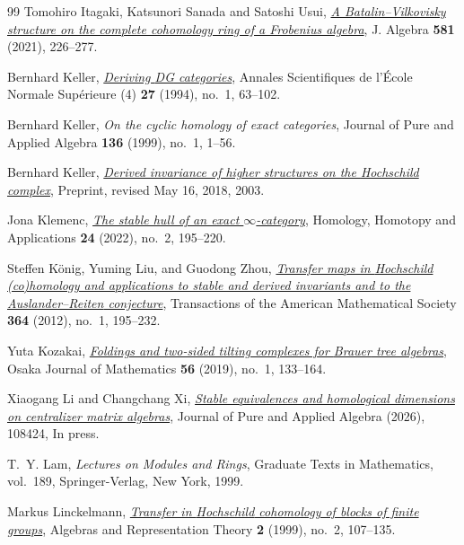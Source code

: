 \documentclass[12pt,a4paper,english,reqno]{amsart}
\numberwithin{equation}{section}
\theoremstyle{plain}
\theoremstyle{definition}
\begin{document}
\begin{thebibliography}{99}
Tomohiro Itagaki, Katsunori Sanada and Satoshi Usui,
\emph{\href{https://doi.org/10.1016/j.jalgebra.2021.04.016}{A Batalin--Vilkovisky structure on the complete cohomology ring of a Frobenius algebra}},
J. Algebra \textbf{581} (2021), 226--277.

Bernhard Keller, \emph{\href{https://doi.org/10.24033/asens.1689}
  {Deriving {DG} categories}},
  Annales Scientifiques de l'\'Ecole Normale Sup\'erieure (4)
  \textbf{27} (1994), no.~1, 63--102.

Bernhard Keller, \emph{On the cyclic homology of exact categories},
Journal of Pure and Applied Algebra \textbf{136} (1999), no.~1, 1--56.

Bernhard Keller,
  \emph{\href{https://webusers.imj-prg.fr/~bernhard.keller/publ/dih.pdf}{Derived
  invariance of higher structures on the {Hochschild} complex}}, Preprint,
  revised May 16, 2018, 2003.

Jona Klemenc, \emph{\href{https://doi.org/10.4310/HHA.2022.v24.n2.a9}{The
  stable hull of an exact {$\infty$}-category}}, Homology, Homotopy and
  Applications \textbf{24} (2022), no.~2, 195--220.

Steffen K{\"o}nig, Yuming Liu, and Guodong Zhou,
  \emph{\href{https://doi.org/10.1090/S0002-9947-2011-05358-4}{Transfer maps in
  {Hochschild} (co)homology and applications to stable and derived invariants
  and to the {Auslander--Reiten} conjecture}}, Transactions of the American
  Mathematical Society \textbf{364} (2012), no.~1, 195--232.

Yuta Kozakai,
  \emph{\href{https://ir.library.osaka-u.ac.jp/repo/ouka/all/71140/ojm56_01_133.pdf}{Foldings
  and two-sided tilting complexes for {Brauer} tree algebras}}, Osaka Journal
  of Mathematics \textbf{56} (2019), no.~1, 133--164.

Xiaogang Li and Changchang Xi,
  \emph{\href{https://doi.org/10.1016/j.jpaa.2026.108424}{Stable equivalences
  and homological dimensions on centralizer matrix algebras}}, Journal of Pure
  and Applied Algebra (2026), 108424, In press.

T.~Y. Lam, \emph{Lectures on Modules and Rings},
Graduate Texts in Mathematics, vol.~189,
Springer-Verlag, New York, 1999.



Markus Linckelmann,
  \emph{\href{https://doi.org/10.1023/A:1009979222100}{Transfer in {Hochschild}
  cohomology of blocks of finite groups}}, Algebras and Representation Theory
  \textbf{2} (1999), no.~2, 107--135.


\end{thebibliography}
\end{document}
